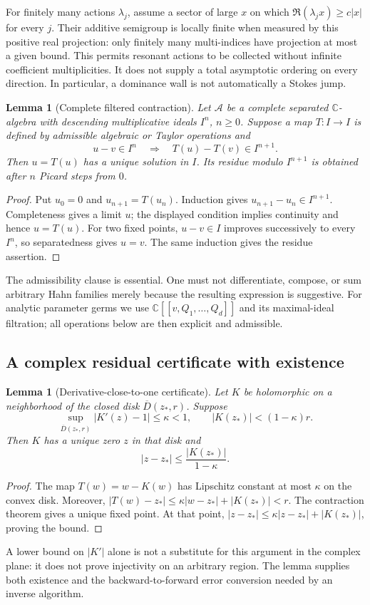 \documentclass[11pt,a4paper]{article}
\numberwithin{equation}{section}
\newtheorem{lemma}[theorem]{Lemma}
\theoremstyle{definition}\newtheorem{definition}[theorem]{Definition}
\theoremstyle{remark}\newtheorem{remark}[theorem]{Remark}
\newcommand{\C}{\mathbb C}\newcommand{\Q}{\mathbb Q}\newcommand{\Z}{\mathbb Z}
\begin{document}
For finitely many actions $\lambda_j$, assume a sector of large $x$ on
which $\Re(\lambda_jx)\ge c|x|$ for every $j$. Their additive semigroup is
locally finite when measured by this positive real projection: only
finitely many multi-indices have projection at most a given bound.
This permits resonant actions to be collected without infinite
coefficient multiplicities. It does not supply a total asymptotic ordering
on every direction. In particular, a dominance wall is not automatically
a Stokes jump.

\begin{lemma}[Complete filtered contraction]\label{lem:formal}
Let $\mathcal A$ be a complete separated $\C$-algebra with descending
multiplicative ideals $I^n$, $n\ge0$. Suppose a map
$T:I\to I$ is defined by admissible algebraic or Taylor operations and
\[
 u-v\in I^n\quad\Longrightarrow\quad T(u)-T(v)\in I^{n+1}.
\]
Then $u=T(u)$ has a unique solution in $I$. Its residue modulo $I^{n+1}$
is obtained after $n$ Picard steps from $0$.
\end{lemma}
\begin{proof}
Put $u_0=0$ and $u_{n+1}=T(u_n)$. Induction gives
$u_{n+1}-u_n\in I^{n+1}$. Completeness gives a limit $u$; the displayed
condition implies continuity and hence $u=T(u)$. For two fixed points,
$u-v\in I$ improves successively to every $I^n$, so separatedness gives
$u=v$. The same induction gives the residue assertion.
\end{proof}

The admissibility clause is essential. One must not differentiate,
compose, or sum arbitrary Hahn families merely because the resulting
expression is suggestive. For analytic parameter germs we use
$\C[[v,Q_1,\ldots,Q_d]]$ and its maximal-ideal filtration; all operations
below are then explicit and admissible.

\subsection{A complex residual certificate with existence}
\begin{lemma}[Derivative-close-to-one certificate]\label{lem:certificate}
Let $K$ be holomorphic on a neighborhood of the closed disk
$\overline D(z_*,r)$. Suppose
\[
 \sup_{\overline D(z_*,r)}|K'(z)-1|\le\kappa<1,
 \qquad |K(z_*)|<(1-\kappa)r.
\]
Then $K$ has a unique zero $z$ in that disk and
\begin{equation}\label{eq:certificate}
 |z-z_*|\le \frac{|K(z_*)|}{1-\kappa}.
\end{equation}
\end{lemma}
\begin{proof}
The map $T(w)=w-K(w)$ has Lipschitz constant at most $\kappa$ on the
convex disk. Moreover,
$|T(w)-z_*|\le\kappa|w-z_*|+|K(z_*)|<r$.
The contraction theorem gives a unique fixed point. At that point,
$|z-z_*|\le\kappa|z-z_*|+|K(z_*)|$, proving the bound.
\end{proof}
A lower bound on $|K'|$ alone is not a substitute for this argument in the
complex plane: it does not prove injectivity on an arbitrary region.
The lemma supplies both existence and the backward-to-forward error
conversion needed by an inverse algorithm.
\end{document}
